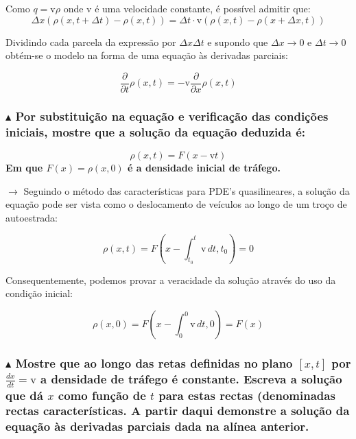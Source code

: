 \noindent Como $q = \text{v}\rho$ onde v é uma velocidade constante, é possível admitir que:
$$
    \Delta x (\rho(x, t + \Delta t) - \rho(x, t)) = \Delta t \cdot \text{v}(\rho(x,t) - \rho(x + \Delta x,t))
$$

\noindent Dividindo cada parcela da expressão por $\Delta x\Delta t$ e supondo que $\Delta x \to 0$ e $\Delta t \to 0$ obtém-se o modelo na forma de uma equação às derivadas parciais:%

$$
    \frac{\partial}{\partial t}\rho(x,t) = -\text{v}\frac{\partial}{\partial x}\rho(x,t)
$$

\subsubsection*{$\blacktriangle$ Por substituição na equação e verificação das condições iniciais, mostre que a
solução da equação deduzida é:}
$$
    \rho(x,t) = F(x - \text{v}t)
$$
\textbf{Em que $F(x) = \rho(x,0)$ é a densidade inicial de tráfego.}

\begin{mdframed}
    \noindent $\pmb{\rightarrow}$ Seguindo o método das características para PDE's quasilineares, a solução da equação pode ser vista como o deslocamento de veículos ao longo de um troço de autoestrada:

    $$
       \rho(x,t) = F\left(x - \int_{t_0}^{t}\text{v}\, dt, t_0\right) = 0
    $$
\end{mdframed}

\noindent Consequentemente, podemos provar a veracidade da solução através do uso da condição inicial:

$$
    \rho(x,0) = F\left(x - \int_{0}^{0}\text{v}\, dt, 0\right) = F(x)
$$

\clearpage
\subsubsection*{$\blacktriangle$ Mostre que ao longo das retas definidas no plano $[x,t]$ por $\frac{dx}{dt} = \text{v}$ a densidade
de tráfego é constante. Escreva a solução que dá $x$ como função de $t$
para estas rectas (denominadas rectas características. A partir daqui demonstre
a solução da equação às derivadas parciais dada na alínea anterior.}

